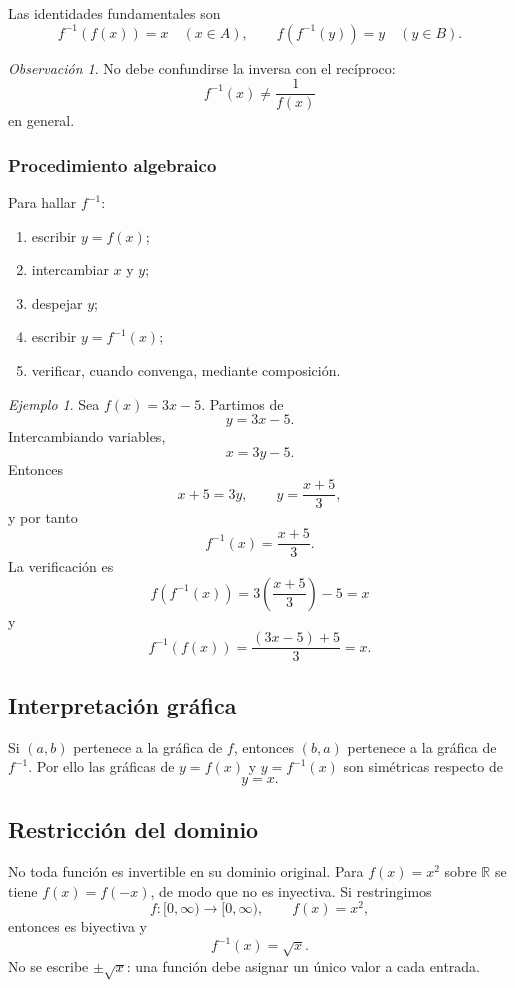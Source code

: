 \documentclass[12pt]{article}
\theoremstyle{remark}
\newtheorem{observacion}{Observación}[section]
\newtheorem{ejemplo}{Ejemplo}[section]
\begin{document}
Las identidades fundamentales son
\[
\boxed{f^{-1}(f(x))=x}\quad(x\in A),
\qquad
\boxed{f(f^{-1}(y))=y}\quad(y\in B).
\]

\begin{observacion}
No debe confundirse la inversa con el recíproco:
\[
\boxed{f^{-1}(x)\neq \frac{1}{f(x)}}
\]
en general.
\end{observacion}
\subsubsection*{Procedimiento algebraico}
Para hallar $f^{-1}$:
\begin{enumerate}
\item escribir $y=f(x)$;
\item intercambiar $x$ y $y$;
\item despejar $y$;
\item escribir $y=f^{-1}(x)$;
\item verificar, cuando convenga, mediante composición.
\end{enumerate}

\begin{ejemplo}
Sea $f(x)=3x-5$. Partimos de
\[
y=3x-5.
\]
Intercambiando variables,
\[
x=3y-5.
\]
Entonces
\[
x+5=3y,\qquad y=\frac{x+5}{3},
\]
y por tanto
\[
\boxed{f^{-1}(x)=\frac{x+5}{3}.}
\]
La verificación es
\[
f\!\left(f^{-1}(x)\right)=3\left(\frac{x+5}{3}\right)-5=x
\]
y
\[
f^{-1}(f(x))=\frac{(3x-5)+5}{3}=x.
\]
\end{ejemplo}
\subsection*{Interpretación gráfica}
Si $(a,b)$ pertenece a la gráfica de $f$, entonces $(b,a)$ pertenece a la gráfica de $f^{-1}$. Por ello las gráficas de $y=f(x)$ y $y=f^{-1}(x)$ son simétricas respecto de
\[
\boxed{y=x}.
\]
\subsection*{Restricción del dominio}
No toda función es invertible en su dominio original. Para $f(x)=x^2$ sobre $\mathbb R$ se tiene $f(x)=f(-x)$, de modo que no es inyectiva. Si restringimos
\[
f:[0,\infty)\to[0,\infty),\qquad f(x)=x^2,
\]
entonces es biyectiva y
\[
\boxed{f^{-1}(x)=\sqrt{x}.}
\]
No se escribe $\pm\sqrt{x}$: una función debe asignar un único valor a cada entrada.
\end{document}

